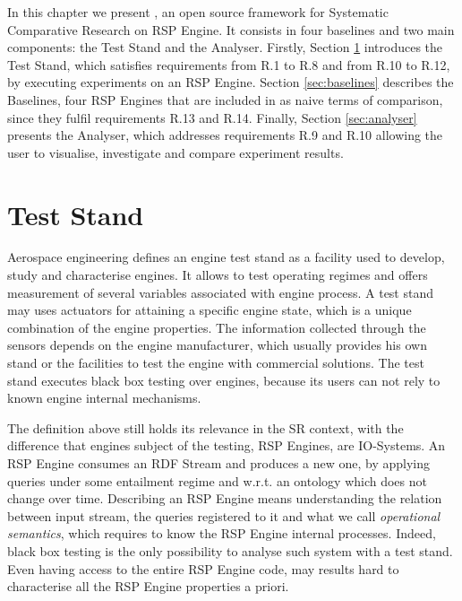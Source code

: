 In this chapter we present  \namens,  an open source framework for Systematic Comparative Research on RSP Engine.
It consists in four baselines and two main components: the Test Stand and the Analyser. Firstly, Section \ref{sec:teststand} introduces the Test Stand, which satisfies requirements from R.1 to R.8 and from R.10 to R.12, by executing experiments on an RSP Engine. Section \ref{sec:baselines} describes the Baselines, four RSP Engines that are included in \name as naive terms of comparison, since they fulfil requirements R.13 and R.14. Finally, Section \ref{sec:analyser} presents the Analyser, which addresses requirements R.9 and R.10  allowing the user to visualise, investigate and compare experiment results. %

\section{Test Stand}\label{sec:teststand}

Aerospace engineering defines an engine test stand as a facility used to develop, study and characterise engines. It allows to test operating regimes and offers measurement of several variables associated with engine process. A test stand may uses actuators for attaining a specific engine state, which is a unique combination of the engine properties. The information collected through the sensors depends on the engine manufacturer, which usually provides his own stand or the facilities to test the engine with commercial solutions. The test stand executes black box testing over engines, because its users can not rely to known engine internal mechanisms.

The definition above still holds its relevance in the SR context, with the difference that engines subject of the testing, RSP Engines, are IO-Systems. An RSP Engine consumes an RDF Stream and  produces a new one, by applying queries under some entailment regime and w.r.t. an ontology which does not change over time. Describing an RSP Engine means understanding the relation between input stream, the queries registered to it and what we call \textit{operational semantics}, which requires to know the RSP Engine internal processes. Indeed, black box testing is the only possibility to analyse such system with a test stand. Even having access to the entire RSP Engine code, may results hard to characterise all the RSP Engine properties a priori. 

